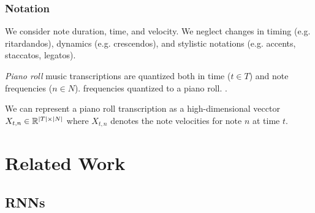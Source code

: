 \documentclass[a4paper,12pt,twoside,openright]{report}
\begin{document}
\subsection{Notation}

We consider note duration, time, and velocity. We neglect changes in timing
(e.g. ritardandos), dynamics (e.g. crescendos), and stylistic notations (e.g.
accents, staccatos, legatos).

\emph{Piano roll} music transcriptions are quantized both in time ($t \in T$)
and note frequencies ($n \in N$). frequencies quantized to a piano roll.
.

We can represent a piano roll transcription as a high-dimensional vecctor
$X_{t,n} \in \mathbb{R}^{|T| \times |N|}$ where $X_{t,n}$ denotes the note
velocities for note $n$ at time $t$.

\chapter{Related Work}






\section{RNNs}
\end{document}
